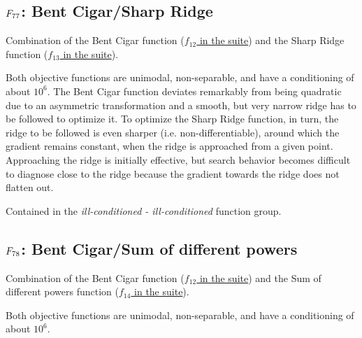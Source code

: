 \subsection[\texorpdfstring{\protect\(F_{77}\protect\): Bent Cigar/Sharp Ridge}{F77: Bent Cigar/Sharp Ridge}]{\texorpdfstring{\protect\(F_{77}\protect\): Bent Cigar/Sharp Ridge}{}}
\label{index:bent-cigar-sharp-ridge}\label{index:f77}
Combination of the Bent Cigar function (\href{https://coco.gforge.inria.fr/downloads/download16.00/bbobdocfunctions.pdf\#page=60}{\(f_{12}\) in the \bbob suite}) and the
Sharp Ridge function (\href{https://coco.gforge.inria.fr/downloads/download16.00/bbobdocfunctions.pdf\#page=65}{\(f_{13}\) in the \bbob suite}).

Both objective functions are unimodal, non-separable, and have a conditioning
of about \(10^6\).
The Bent Cigar function deviates remarkably
from being quadratic due to an asymmetric transformation and a smooth,
but very narrow ridge has to be followed to optimize it.
To optimize the Sharp Ridge function, in turn, the ridge to be followed
is even sharper (i.e. non-differentiable), around which the gradient remains
constant, when the ridge is approached from a given point. Approaching the ridge is
initially effective, but search behavior becomes difficult to diagnose
close to the ridge because the gradient towards the ridge does not flatten out.

Contained in the \emph{ill-conditioned - ill-conditioned} function group.



\subsection[\texorpdfstring{\protect\(F_{78}\protect\): Bent Cigar/Sum of different powers}{F78: Bent Cigar/Sum of different powers}]{\texorpdfstring{\protect\(F_{78}\protect\): Bent Cigar/Sum of different powers}{}}
\label{index:f78}\label{index:bent-cigar-sum-of-different-powers}
Combination of the Bent Cigar function (\href{https://coco.gforge.inria.fr/downloads/download16.00/bbobdocfunctions.pdf\#page=60}{\(f_{12}\) in the \bbob suite}) and the
Sum of different powers function (\href{https://coco.gforge.inria.fr/downloads/download16.00/bbobdocfunctions.pdf\#page=70}{\(f_{14}\) in the \bbob suite}).

Both objective functions are unimodal, non-separable, and have a conditioning
of about \(10^6\).

